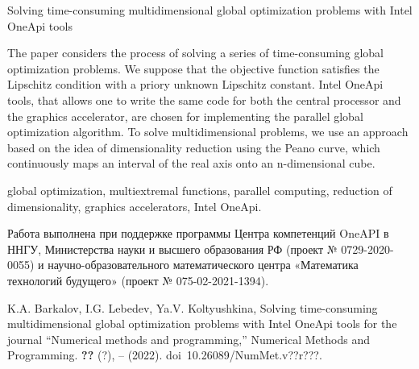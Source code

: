 \documentclass[10pt,a4paper]{book}
\begin{document}
    {Solving time-consuming multidimensional global optimization problems with Intel OneApi tools}
    
    {The paper considers the process of solving a series of time-consuming global optimization problems. We suppose that the objective function satisfies the Lipschitz condition with a priory unknown Lipschitz constant. Intel OneApi tools, that allows one to write the same code for both the central processor and the graphics accelerator, are chosen for implementing the parallel global optimization algorithm. To solve multidimensional problems, we use an approach based on the idea of dimensionality reduction using the Peano curve, which continuously maps an interval of the real axis onto an n-dimensional cube.}

        {global optimization,
multiextremal functions,
parallel computing,
reduction of dimensionality,
graphics accelerators,
Intel OneApi.}

    {Работа выполнена при поддержке программы Центра компетенций OneAPI в ННГУ, Министерства науки и высшего образования РФ (проект № 0729-2020-0055) и научно-образовательного математического центра «Математика технологий будущего» (проект № 075-02-2021-1394).}

    {K.A. Barkalov, I.G. Lebedev, Ya.V. Koltyushkina,
    Solving time-consuming multidimensional global optimization problems with Intel OneApi tools 
    for the journal ``Numerical methods and programming,''
    Numerical Methods and Programming. \textbf{??} (?), 
    \pageref*{firstPage}--\pageref*{LastPage} (2022).
    doi~10.26089/NumMet.v??r???.}
\end{document}
